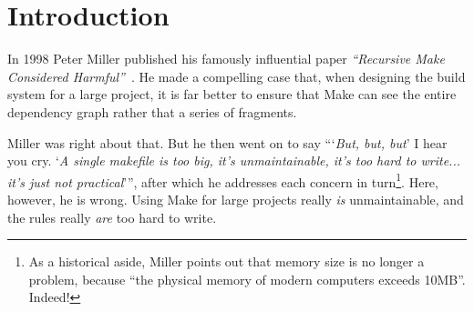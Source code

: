 \section{Introduction}

In 1998 Peter Miller published his famously influential paper
\emph{``Recursive Make Considered Harmful''}~\cite{miller:recursive_make}.
He made a compelling case that, when designing the build system for
a large project, it is far better to ensure that Make can see
the entire dependency graph rather that a series of fragments.

Miller was right about that.  But he then went on to say ```\emph{But, but, but}'
I hear you cry.  `\emph{A single makefile is too big, it's unmaintainable,
it's too hard to write... it's just not practical}''', after which he
addresses each concern in turn\footnote{
As a historical aside, Miller points out that memory size is no
longer a problem, because
``the physical memory of modern computers exceeds 10MB''.  Indeed!}.
Here, however, he is wrong.  Using
Make for large projects really \emph{is} unmaintainable, and the rules really
\emph{are} too hard to write. 

